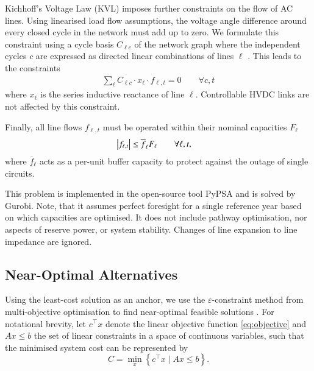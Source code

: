 Kichhoff's Voltage Law (KVL) imposes further constraints on the flow of AC lines.
Using linearised load flow assumptions, the voltage angle difference around every closed cycle in the
network must add up to zero. We formulate this constraint using a cycle basis $C_{\ell c}$
of the network graph where the independent cycles $c$ are expressed as
directed linear combinations of lines $\ell$ \cite{cycleflows}.
This leads to the constraints
\begin{align}
    \sum_\ell C_{\ell c} \cdot x_\ell \cdot f_{\ell,t} = 0 \qquad\forall c,t
    \label{eq:kvl}
\end{align}
where $x_\ell$ is the series inductive reactance of line $\ell$.
Controllable HVDC links are not affected by this constraint.

Finally, all line flows $f_{\ell,t}$ must be operated within their nominal capacities $F_\ell$
\begin{align}
    \left|f_{\ell,t}\right| \leq \overline{f}_{\ell} F_{\ell} & \qquad\forall \ell, t,
    \label{eq:lastA}
\end{align}
where $\overline{f}_\ell$ acts as a per-unit buffer capacity
to protect against the outage of single circuits.

This problem is implemented in the open-source tool PyPSA \cite{pypsa} and is solved by Gurobi.
Note, that it assumes perfect foresight for a single reference year based on which capacities are optimised.
It does not include pathway optimisation, nor aspects of reserve power, or system stability.
Changes of line expansion to line impedance are ignored.

\subsection{Near-Optimal Alternatives}
\label{sec:nearoptimal}

Using the least-cost solution as an anchor, we use the
$\varepsilon$-constraint method from multi-objective optimisation
to find near-optimal feasible solutions \cite{nearoptimal,mavrotas_effective_2009}.
For notational brevity, let $c^\top x$ denote the linear objective function \cref{eq:objective}
and $Ax\leq b$ the set of linear constraints 
in a space of continuous variables, 
such that the minimised system cost can be represented by
\begin{equation}
    C = \min_x\left\{c^\top x \mid Ax\leq b\right\}.
\end{equation}

